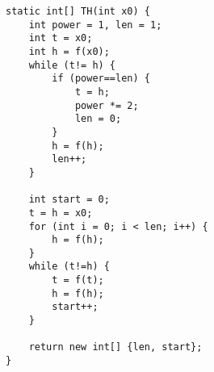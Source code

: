 \begin{verbatim}
static int[] TH(int x0) {
	int power = 1, len = 1;
	int t = x0;
	int h = f(x0);
	while (t!= h) {
		if (power==len) {
			t = h;
			power *= 2;
			len = 0;
		}
		h = f(h);
		len++;
	}

	int start = 0;
	t = h = x0;
	for (int i = 0; i < len; i++) {
		h = f(h);
	}
	while (t!=h) {
		t = f(t);
		h = f(h);
		start++;
	}

	return new int[] {len, start};
}
\end{verbatim}